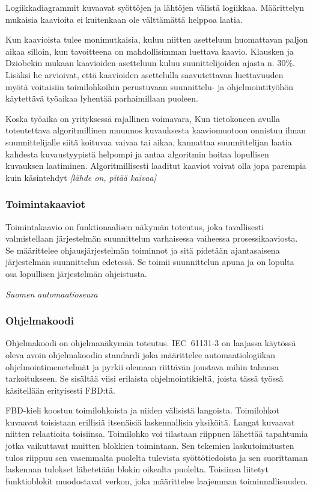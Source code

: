 \documentclass[finnish,12pt]{article}
\begin{document}
Logiikkadiagrammit kuvaavat syöttöjen ja lähtöjen välistä logiikkaa.
Määrittelyn mukaisia kaavioita ei kuitenkaan ole välttämättä helppoa laatia.

Kun kaavioista tulee monimutkaisia, kuluu niitten asetteluun huomattavan paljon aikaa silloin, kun tavoitteena on mahdollisimman luettava kaavio.
Klausken ja Dziobekin mukaan kaavioiden asetteluun kuluu suunittelijoiden ajasta n. 30\%.
Lisäksi he arvioivat, että kaavioiden asettelulla saavutettavan luettavuuden myötä voitaisiin toimilohkoihin perustuvaan suunnittelu- ja ohjelmointityöhön käytettävä työaikaa lyhentää parhaimillaan puoleen. \cite{Refworks:63}

Koska työaika on yrityksessä rajallinen voimavara,
Kun tietokoneen avulla toteutettava algoritmillinen muunnos kuvauksesta kaaviomuotoon onnistuu ilman suunnittelijalle siitä koituvaa vaivaa tai aikaa, kannattaa suunnittelijan laatia kahdesta kuvaustyypistä helpompi ja antaa algoritmin hoitaa lopullisen kuvauksen laatiminen.
Algoritmillisesti laaditut kaaviot voivat olla jopa parempia kuin käsintehdyt  \emph{[lähde on, pitää kaivaa]}


		\subsubsection{Toimintakaaviot}

Toimintakaavio on funktionaalisen näkymän toteutus, joka tavallisesti valmistellaan järjestelmän suunnittelun varhaisessa vaiheessa prosessikaaviosta.
Se määrittelee ohjausjärjestelmän toiminnot ja sitä pidetään ajantasaisena järjestelmän suunnittelun edetessä.
Se toimii suunnittelun apuna ja on lopulta osa lopullisen järjestelmän ohjeistusta.

\emph{Suomen automaatioseura}

		\subsubsection{Ohjelmakoodi}

Ohjelmakoodi on ohjelmanäkymän toteutus.
IEC~61131-3 on laajassa käytössä oleva avoin ohjelmakoodin standardi joka määrittelee automaatiologiikan ohjelmointimenetelmät ja pyrkii olemaan riittävän joustava mihin tahansa tarkoitukseen. \cite{RefWorks:62}
Se sisältää viisi erilaista ohjelmointikieltä, joista tässä työssä käsitellään erityisesti FBD:tä.

FBD-kieli koostuu toimilohkoista ja niiden välisistä langoista.
Toimilohkot kuvaavat toisistaan erillisiä itsenäisiä laskennallisia yksiköitä.
Langat kuvaavat niitten relaatioita toisiinsa.
Toimilohko voi tilastaan riippuen lähettää tapahtumia jotka vaikuttavat muitten blokkien toimintaan.
Sen tekemien laskutoimitusten tulos riippuu sen vasemmalta puolelta tulevista syöttötiedoista ja sen suorittaman laskennan tulokset lähetetään blokin oikealta puolelta.
Toisiinsa liitetyt funktioblokit muodostavat verkon, joka määrittelee laajemman toiminnallisuuden. \cite{RefWorks:55}
\end{document}
